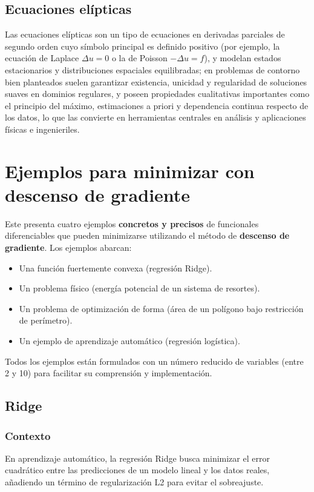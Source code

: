 \documentclass[12pt]{book}
\theoremstyle{definition}
\theoremstyle{plain}
\theoremstyle{remark}
\begin{document}
\section{Ecuaciones elípticas}
Las ecuaciones elípticas son un tipo de ecuaciones en derivadas parciales de segundo orden cuyo símbolo principal es definido positivo (por ejemplo, la ecuación de Laplace $\Delta u=0$ o la de Poisson $-\Delta u=f$), y modelan estados estacionarios y distribuciones espaciales equilibradas; en problemas de contorno bien planteados suelen garantizar existencia, unicidad y regularidad de soluciones suaves en dominios regulares, y poseen propiedades cualitativas importantes como el principio del máximo, estimaciones a priori y dependencia continua respecto de los datos, lo que las convierte en herramientas centrales en análisis y aplicaciones físicas e ingenieriles.

\chapter{Ejemplos para minimizar con descenso de gradiente}

Este presenta cuatro ejemplos \textbf{concretos y precisos} de funcionales diferenciables que pueden minimizarse utilizando el método de \textbf{descenso de gradiente}. Los ejemplos abarcan:
\begin{itemize}
    \item Una función fuertemente convexa (regresión Ridge).
    \item Un problema físico (energía potencial de un sistema de resortes).
    \item Un problema de optimización de forma (área de un polígono bajo restricción de perímetro).
    \item Un ejemplo de aprendizaje automático (regresión logística).
\end{itemize}
Todos los ejemplos están formulados con un número reducido de variables (entre 2 y 10) para facilitar su comprensión y implementación.

\section{Ridge} 
\subsection{Contexto}
En aprendizaje automático, la regresión Ridge busca minimizar el error cuadrático entre las predicciones de un modelo lineal y los datos reales, añadiendo un término de regularización L2 para evitar el sobreajuste.
\end{document}
